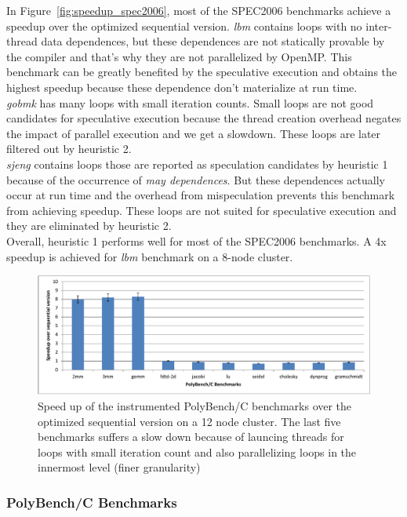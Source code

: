 \documentclass[10pt]{report}          %
\begin{document}
In Figure~\ref{fig:speedup_spec2006}, most of the SPEC2006 benchmarks achieve a speedup over the optimized sequential version.  \textit{lbm} contains loops with no inter-thread data dependences, but these dependences are not statically provable by the compiler and that's why they are not parallelized by OpenMP. This benchmark can be greatly benefited by the speculative execution and obtains the highest speedup because these dependence don't materialize at run time.\\
\textit{gobmk} has many loops with small iteration counts. Small loops are not good candidates for speculative execution because the thread creation overhead negates the impact of parallel execution and we get a slowdown. These loops are later filtered out by heuristic 2.\\
\textit{sjeng} contains loops those are reported as speculation candidates by heuristic 1 because of the occurrence of \textit{may dependences}.  But these dependences actually occur at run time and the overhead from mispeculation prevents this benchmark from achieving speedup.  These loops are not suited for speculative execution and they are eliminated by heuristic 2.\\
Overall, heuristic 1 performs well for most of the SPEC2006 benchmarks.  A 4x speedup is achieved for \textit{lbm} benchmark on a 8-node cluster. 

\begin{figure}[h]
\begin{center}
\includegraphics[scale =0.75]{./pdf/speedup_polybench.pdf}
\caption{Speed up of the instrumented PolyBench/C benchmarks over the optimized sequential version on a 12 node cluster. The last five benchmarks suffers a slow down because of launcing threads for loops with small iteration count and also parallelizing loops in the innermost level (finer granularity)}
\end{center}
\label{fig:speedup_polybench}
\end{figure}

\subsubsection{PolyBench/C Benchmarks}
\end{document}
